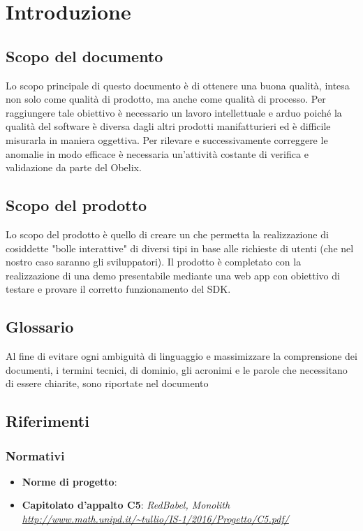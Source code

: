 
\section{Introduzione}
\subsection{Scopo del documento}


Lo scopo principale di questo documento è di ottenere una buona
qualità, intesa non solo come qualità di prodotto, ma anche come
qualità di processo. Per raggiungere tale obiettivo è necessario un
lavoro intellettuale e arduo poiché la qualità del software è diversa
dagli altri prodotti manifatturieri ed è difficile misurarla in
maniera oggettiva. Per rilevare e successivamente correggere le
anomalie in modo efficace è necessaria un'attività costante di
verifica e validazione da parte del  Obelix.


\subsection{Scopo del prodotto}

Lo scopo del prodotto è quello di creare un  che permetta la
realizzazione di cosiddette "bolle interattive" di diversi tipi in
base alle richieste di utenti (che nel nostro caso saranno gli
sviluppatori). Il prodotto è completato con la realizzazione di una
demo presentabile mediante una web app con obiettivo di testare e
provare il corretto funzionamento del SDK.

\subsection{Glossario}
Al fine di evitare ogni ambiguità di linguaggio e massimizzare la
comprensione dei documenti, i termini tecnici, di dominio, gli
acronimi e le parole che necessitano di essere chiarite, sono
riportate nel documento \gloss

\subsection{Riferimenti}

\subsubsection{Normativi}

\begin{itemize}
\item \textbf{Norme di progetto}:  \normediprogetto
\item \textbf{Capitolato d'appalto C5}: \emph{RedBabel, Monolith \url{http://www.math.unipd.it/~tullio/IS-1/2016/Progetto/C5.pdf/}}

\end{itemize}

